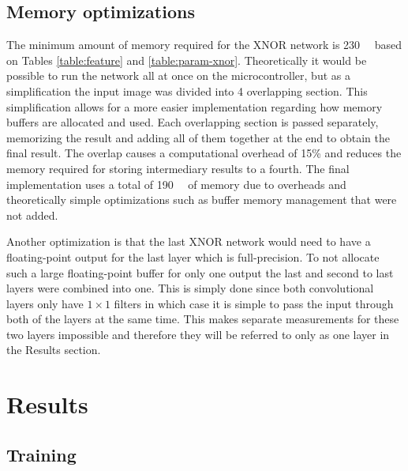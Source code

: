 \documentclass[conference]{IEEEtran}
\begin{document}
\subsection{Memory optimizations}

The minimum amount of memory required for the XNOR network is \SI{230}{\kilo\byte} based on Tables \ref{table:feature} and \ref{table:param-xnor}. Theoretically it would be possible to run the network all at once on the microcontroller, but as a simplification the input image was divided into 4 overlapping section. This simplification allows for a more easier implementation regarding how memory buffers are allocated and used. Each overlapping section is passed separately, memorizing the result and adding all of them together at the end to obtain the final result. The overlap causes a computational overhead of 15\% and reduces the memory required for storing intermediary results to a fourth. The final implementation uses a total of \SI{190}{\kilo\byte} of memory due to overheads and theoretically simple optimizations such as buffer memory management that were not added.

Another optimization is that the last XNOR network would need to have a floating-point output for the last layer which is full-precision. To not allocate such a large floating-point buffer for only one output the last and second to last layers were combined into one. This is simply done since both convolutional layers only have $1\times 1$ filters in which case it is simple to pass the input through both of the layers at the same time. This makes separate measurements for these two layers impossible and therefore they will be referred to only as one layer in the Results section.

\section{Results}

\subsection{Training}
\end{document}
